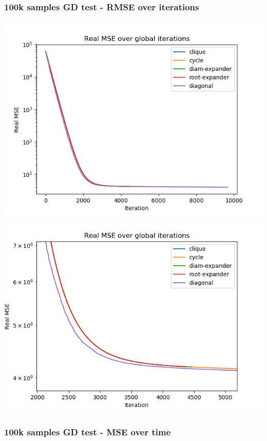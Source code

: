\documentclass[11pt]{article}
\makeatletter
\def\maxwidth{\ifdim\Gin@nat@width>\linewidth\linewidth
    \else\Gin@nat@width\fi}
\let\Oldincludegraphics\includegraphics
\renewcommand{\includegraphics}[1]{\Oldincludegraphics[width=.8\maxwidth]{#1}}
\makeatother
\begin{document}
    \subsubsection{100k samples GD test - RMSE over
iterations}\label{k-samples-gd-test---rmse-over-iterations}

\includegraphics{media/img/tests/test_003_100ksamples_classic/2_real-mse_iter.png}
\includegraphics{media/img/tests/test_003_100ksamples_classic/2_real-mse_iter_zoom.png}

    \subsubsection{100k samples GD test - MSE over
time}\label{k-samples-gd-test---mse-over-time}
\end{document}
